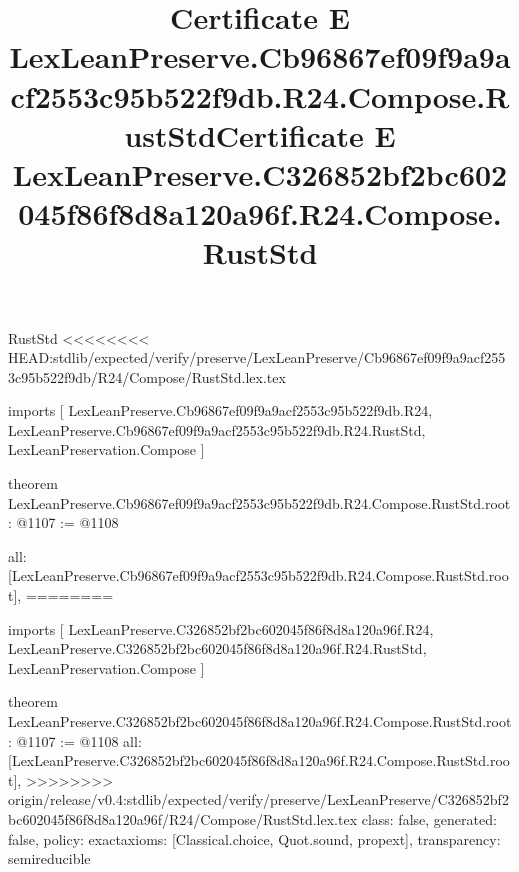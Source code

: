 \begin{lexlean}{RustStd}
<<<<<<<< HEAD:stdlib/expected/verify/preserve/LexLeanPreserve/Cb96867ef09f9a9acf2553c95b522f9db/R24/Compose/RustStd.lex.tex
\title{Certificate E LexLeanPreserve.Cb96867ef09f9a9acf2553c95b522f9db.R24.Compose.RustStd}
\begin{coremodule}
imports [
  LexLeanPreserve.Cb96867ef09f9a9acf2553c95b522f9db.R24,
  LexLeanPreserve.Cb96867ef09f9a9acf2553c95b522f9db.R24.RustStd,
  LexLeanPreservation.Compose
]

theorem LexLeanPreserve.Cb96867ef09f9a9acf2553c95b522f9db.R24.Compose.RustStd.root : @1107 := @1108 {
  all: [LexLeanPreserve.Cb96867ef09f9a9acf2553c95b522f9db.R24.Compose.RustStd.root],
========
\title{Certificate E LexLeanPreserve.C326852bf2bc602045f86f8d8a120a96f.R24.Compose.RustStd}
\begin{coremodule}
imports [
  LexLeanPreserve.C326852bf2bc602045f86f8d8a120a96f.R24,
  LexLeanPreserve.C326852bf2bc602045f86f8d8a120a96f.R24.RustStd,
  LexLeanPreservation.Compose
]

theorem LexLeanPreserve.C326852bf2bc602045f86f8d8a120a96f.R24.Compose.RustStd.root : @1107 := @1108 {
  all: [LexLeanPreserve.C326852bf2bc602045f86f8d8a120a96f.R24.Compose.RustStd.root],
>>>>>>>> origin/release/v0.4:stdlib/expected/verify/preserve/LexLeanPreserve/C326852bf2bc602045f86f8d8a120a96f/R24/Compose/RustStd.lex.tex
  class: false,
  generated: false,
  policy: exact{axioms: [Classical.choice, Quot.sound, propext]},
  transparency: semireducible
}


\end{coremodule}}
\end{coremodule}
\end{lexlean}
